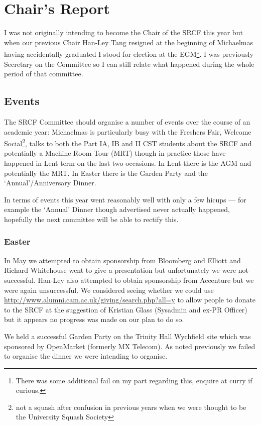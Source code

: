 \section{Chair's Report}

I was not originally intending to become the Chair of the SRCF this year but when our previous Chair Han-Ley Tang resigned at the beginning of Michaelmas having accidentally graduated I stood for election at the EGM\footnote{There was some additional fail on my part regarding this, enquire at curry if curious.}. I was previously Secretary on the Committee so I can still relate what happened during the whole period of that committee.

\subsection{Events}
The SRCF Committee should organise a number of events over the course of an academic year: Michaelmas is particularly busy with the Freshers Fair, Welcome Social\footnote{not a squash after confusion in previous years when we were thought to be the University Squash Society}, talks to both the Part IA, IB and II CST students about the SRCF and potentially a Machine Room Tour (MRT) though in practice those have happened in Lent term on the last two occasions. In Lent there is the AGM and potentially the MRT. In Easter there is the Garden Party and the `Annual'/Anniversary Dinner.

In terms of events this year went reasonably well with only a few hicups --- for example the `Annual' Dinner though advertised never actually happened, hopefully the next committee will be able to rectify this.


\subsubsection{Easter}
In May we attempted to obtain sponsorship from Bloomberg and Elliott and Richard Whitehouse went to give a presentation but unfortunately we were not successful. Han-Ley also attempted to obtain sponsorship from Accenture but we were again unsuccessful.
We considered seeing whether we could use \url{http://www.alumni.cam.ac.uk/giving/search.php?all=y} to allow people to donate to the SRCF at the suggestion of Kristian Glass (Sysadmin and ex-PR Officer) but it appears no progress was made on our plan to do so.

We held a successful Garden Party on the Trinity Hall Wychfield site which was sponsored by OpenMarket (formerly MX Telecom). As noted previously we failed to organise the dinner we were intending to organise.

